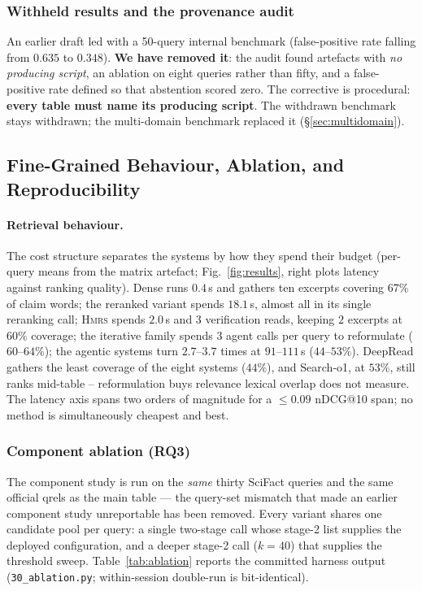 \documentclass[sigconf, review, anonymous]{acmart}
\newcommand{\sys}{\textsc{Hmrs}}
\begin{document}
\subsubsection{Withheld results and the provenance audit}\label{sec:provenance}
An earlier draft led with a 50-query internal benchmark (false-positive rate
falling from $0.635$ to $0.348$). \textbf{We have removed it}: the audit
found artefacts with \emph{no producing script}, an ablation on eight queries
rather than fifty, and a false-positive rate defined so that abstention scored
zero. The corrective is procedural: \textbf{every table must name its producing
script}. The withdrawn benchmark stays withdrawn; the multi-domain benchmark
replaced it (\S\ref{sec:multidomain}).

\subsection{Fine-Grained Behaviour, Ablation, and Reproducibility}\label{sec:behaviour}

\paragraph{Retrieval behaviour.} The cost structure separates the systems by
how they spend their budget (per-query means from the matrix artefact;
Fig.~\ref{fig:results}, right plots latency against ranking quality). Dense
runs $0.4$\,s and gathers ten excerpts covering $67\%$ of claim words; the
reranked variant spends $18.1$\,s, almost all in its single reranking call;
\sys{} spends $2.0$\,s and $3$ verification reads, keeping $2$ excerpts at
$60\%$ coverage; the iterative family spends $3$ agent calls per query to
reformulate ($60$--$64\%$); the agentic systems turn $2.7$--$3.7$ times at
$91$--$111$\,s ($44$--$53\%$). DeepRead gathers the least coverage of the
eight systems ($44\%$), and Search-o1, at $53\%$, still ranks mid-table --
reformulation buys relevance lexical overlap does not measure. The latency axis spans two orders of magnitude for a $\le 0.09$
nDCG@10 span; no method is simultaneously cheapest and best.

\subsubsection{Component ablation (RQ3)}\label{sec:ablation}
The component study is run on the \emph{same} thirty SciFact queries and the
same official qrels as the main table --- the query-set mismatch that made an
earlier component study unreportable has been removed. Every variant shares one
candidate pool per query: a single two-stage call whose stage-2 list supplies
the deployed configuration, and a deeper stage-2 call ($k{=}40$) that supplies
the threshold sweep. Table~\ref{tab:ablation} reports the committed harness
output (\texttt{30\_ablation.py}; within-session double-run is bit-identical).
\end{document}
